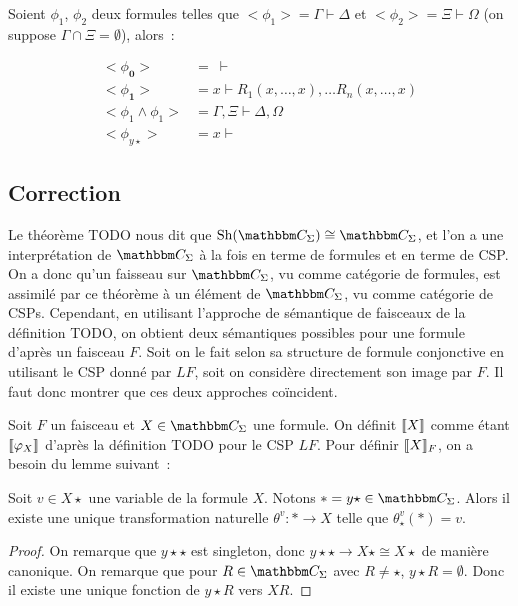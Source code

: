 \begin{lem}
    Soient $\phi_1$, $\phi_2$ deux formules telles que $<\phi_1> = \Gamma\vdash\Delta$ et
    $<\phi_2> = \Xi\vdash\Omega$ (on suppose $\Gamma\cap\Xi=\emptyset$), alors~:

    \begin{align*}
        <\phi_\mathbf{0}> &=~\vdash \\
        <\phi_\mathbf{1}> &= x\vdash R_1(x,\dots, x),\dots R_n(x, \dots, x) \\
        <\phi_1\wedge\phi_1> &= \Gamma,\Xi\vdash\Delta,\Omega \\
        <\phi_{y\star}> &= x\vdash
    \end{align*}
\end{lem}

\subsection{Correction}

Le théorème TODO nous dit que $\sh(\C_\Sigma)\cong \C_\Sigma$, et l'on a une
interprétation de $\C_\Sigma$ à la fois en terme de formules et en terme de CSP.
On a donc qu'un faisseau sur $\C_\Sigma$, vu comme catégorie de formules, est
assimilé par ce théorème à un élément de $\C_\Sigma$, vu comme catégorie de CSPs.
Cependant, en utilisant l'approche de sémantique de faisceaux de la définition
TODO, on obtient deux sémantiques possibles pour une formule d'après un faisceau $F$.
Soit on le fait selon sa structure de formule conjonctive en utilisant le CSP donné
par $LF$, soit on considère directement son image par $F$. Il faut donc montrer que
ces deux approches coïncident.

Soit $F$ un faisceau et $X\in\C_\Sigma$ une formule. On définit $\llbracket {X} \rrbracket$ comme
étant $\llbracket {\varphi_X} \rrbracket$ d'après la définition TODO pour le CSP $LF$. Pour définir
$\llbracket {X} \rrbracket_F$, on a besoin du lemme suivant~:

\begin{lem}
    Soit $v\in X\star$ une variable de la formule $X$. Notons
    $\ast = y\star\in\C_\Sigma$. Alors il existe une unique transformation naturelle
    $\theta^v : \ast\rightarrow X$ telle que $\theta^v_\star(*) = v$.
\end{lem}

\begin{proof}
    On remarque que $y\star\star$ est singleton, donc
    $y\star\star\rightarrow X\star\cong X\star$ de manière canonique. On remarque que pour
    $R\in\C_\Sigma$ avec $R\neq\star$, $y\star R=\emptyset$. Donc il existe une unique
    fonction de $y\star R$ vers $X R$. 
\end{proof}

